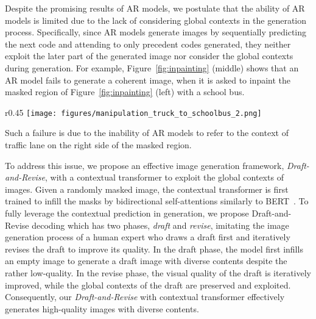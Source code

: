 \documentclass{article}
\begin{document}
Despite the promising results of AR models, we postulate that the ability of AR models is limited due to the lack of considering global contexts in the generation process. Specifically, since AR models generate images by sequentially predicting the next code and attending to only precedent codes generated, they neither exploit the later part of the generated image nor consider the global contexts during generation.
For example, Figure~\ref{fig:inpainting} (middle) shows that an AR model fails to generate a coherent image, when it is asked to inpaint the masked region of Figure~\ref{fig:inpainting} (left) with a school bus. 
\begin{wrapfigure}{r}{0.45\textwidth}
\centering
\texttt{[image: figures/manipulation\_truck\_to\_schoolbus\_2.png]}
\caption{Examples of image inpainting by an AR model (middle) and ours (right).}
\label{fig:inpainting}
\vspace{-0.1in}
\end{wrapfigure}
Such a failure is due to the inability of AR models to refer to the context of traffic lane on the right side of the masked region.


To address this issue, we propose an effective image generation framework, \emph{Draft-and-Revise}, with a contextual transformer to exploit the global contexts of images.
Given a randomly masked image, the contextual transformer is first trained to infill the masks by bidirectional self-attentions similarly to BERT~\cite{BERT}.
To fully leverage the contextual prediction in generation, we propose Draft-and-Revise decoding which has two phases, \emph{draft} and \emph{revise}, imitating the image generation process of a human expert who draws a draft first and iteratively revises the draft to improve its quality.
In the draft phase, the model first infills an empty image to generate a draft image with diverse contents despite the rather low-quality. 
In the revise phase, the visual quality of the draft is iteratively improved, while the global contexts of the draft are preserved and exploited.
Consequently, our \emph{Draft-and-Revise} with contextual transformer effectively generates high-quality images with diverse contents.
\end{document}
